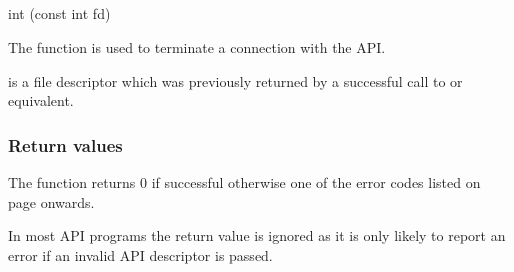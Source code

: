 \subsection{\funcnameXBclose{}}

\begin{expara}

int \funcnameXBclose{}(const int fd)

\end{expara}

The function \funcXBclose{} is used to terminate a
connection with the API.

 is a file descriptor which was previously
returned by a successful call to \funcXBopen{} or equivalent.

\subsubsection{Return values}
The function returns 0 if successful otherwise one of the error codes
listed on page \pageref{errorcodes} onwards.

In most API programs the return value is ignored as it is only likely to
report an error if an invalid API descriptor is passed.

